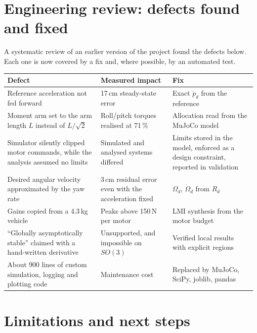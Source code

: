 \documentclass[10pt,a4paper]{scrartcl}
\newcommand{\RuleSection}[1]{%
    \section{#1}%
    \vspace{0.2em}{\color{accent!35}\hrule height 0.4pt}\vspace{0.3em}%
  }
\begin{document}
  \RuleSection{Engineering review: defects found and fixed}
  \label{sec:review}

  A systematic review of an earlier version of the project found the defects below. Each one is
  now covered by a fix and, where possible, by an automated test.

  \begin{table}[H]
  \small
  \centering
  \renewcommand{\arraystretch}{1.1}
  \begin{tabularx}{\textwidth}{@{}L{5.0cm} L{4.2cm} X@{}}
  \toprule
  \textbf{Defect} & \textbf{Measured impact} & \textbf{Fix} \\[.15cm]
  \midrule
  Reference acceleration not fed forward & 17\,cm steady-state error & Exact $\ddot p_d$ from the reference \\[.15cm]
  Moment arm set to the arm length $L$ instead of $L/\sqrt2$ & Roll/pitch torques realised at 71\,\% & Allocation read from the MuJoCo model \\[.15cm]
  Simulator silently clipped motor commands, while the analysis assumed no limits & Simulated and analysed systems differed & Limits stored in the model, enforced as a design constraint, reported in validation \\[.15cm]
  Desired angular velocity approximated by the yaw rate & 3\,cm residual error even with the acceleration fixed & $\Omega_d$, $\dot\Omega_d$ from $R_d$ \\[.15cm]
  Gains copied from a 4.3\,kg vehicle & Peaks above 150\,N per motor & LMI synthesis from the motor budget \\[.15cm]
  ``Globally asymptotically stable'' claimed with a hand-written derivative & Unsupported, and impossible on $SO(3)$ & Verified local results with explicit regions \\[.15cm]
  About 900 lines of custom simulation, logging and plotting code & Maintenance cost & Replaced by MuJoCo, SciPy, joblib, pandas \\[.15cm]
  \bottomrule
  \end{tabularx}
  \end{table}

  \RuleSection{Limitations and next steps}
  \label{sec:next}
\end{document}
